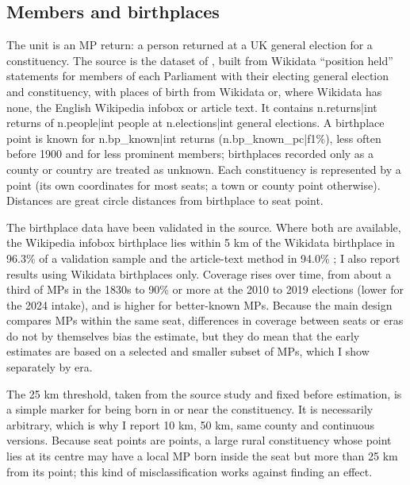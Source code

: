 \documentclass[11pt,a4paper]{article}
\begin{document}
\subsection{Members and birthplaces}
The unit is an MP return: a person returned at a UK general election for a constituency. The source is the dataset of \citet{hotham2026mpl}, built from Wikidata \citep{wikidata} ``position held'' statements for members of each Parliament with their electing general election and constituency, with places of birth from Wikidata or, where Wikidata has none, the English Wikipedia infobox or article text. It contains {{n.returns|int}} returns of {{n.people|int}} people at {{n.elections|int}} general elections. A birthplace point is known for {{n.bp_known|int}} returns ({{n.bp_known_pc|f1}}\%), less often before 1900 and for less prominent members; birthplaces recorded only as a county or country are treated as unknown. Each constituency is represented by a point (its own coordinates for most seats; a town or county point otherwise). Distances are great circle distances from birthplace to seat point.

The birthplace data have been validated in the source. Where both are available, the Wikipedia infobox birthplace lies within 5 km of the Wikidata birthplace in 96.3\% of a validation sample and the article-text method in 94.0\% \citep{hotham2026mpl}; I also report results using Wikidata birthplaces only. Coverage rises over time, from about a third of MPs in the 1830s to 90\% or more at the 2010 to 2019 elections (lower for the 2024 intake), and is higher for better-known MPs. Because the main design compares MPs within the same seat, differences in coverage between seats or eras do not by themselves bias the estimate, but they do mean that the early estimates are based on a selected and smaller subset of MPs, which I show separately by era.

The 25 km threshold, taken from the source study and fixed before estimation, is a simple marker for being born in or near the constituency. It is necessarily arbitrary, which is why I report 10 km, 50 km, same county and continuous versions. Because seat points are points, a large rural constituency whose point lies at its centre may have a local MP born inside the seat but more than 25 km from its point; this kind of misclassification works against finding an effect.
\end{document}
